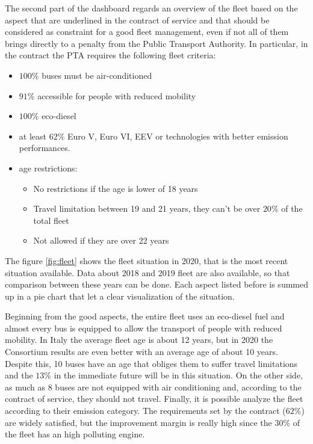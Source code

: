 The second part of the dashboard regards an overview of the fleet based on the aspect that are underlined in the contract of service and that should be considered as constraint for a good fleet management, even if not all of them brings directly to a penalty from the Public Transport Authority. 
In particular, in the contract the PTA requires the following fleet criteria:
\begin{itemize}
\item $100\%$ buses must be air-conditioned
\item $91\%$ accessible for people with reduced mobility
\item  $100\%$ eco-diesel
\item at least $62\%$ Euro V, Euro VI, EEV or technologies with better emission performances.
\item  age restrictions:
    \begin{itemize}
        \item No restrictions if the age is lower of 18 years
        \item Travel limitation between 19 and 21 years, they can't be over $20\%$ of the total fleet
        \item Not allowed if they are over 22 years
    \end{itemize}
\end{itemize}
The figure \ref{fig:fleet}
shows the fleet situation in 2020, that is the most recent situation available. Data about 2018 and 2019 fleet are also available, so that comparison between these years can be done. Each aspect listed before is summed up in a pie chart that let a clear visualization of the situation.

Beginning from the good aspects, the entire fleet uses an eco-diesel fuel and almost every bus is equipped to allow the transport of people with reduced mobility. 
In Italy the average fleet age is about 12 years\cite{rossiPTM}, but in 2020 the Consortium results are even better with an average age of about 10 years. Despite this, 10 buses have an age that obliges them to suffer travel limitations and the $13\%$ in the immediate future will be in this situation. 
On the other side, as much as 8 buses are not equipped with air conditioning and, according to the contract of service, they should not travel. Finally, it is possible analyze the fleet according to their emission category. The requirements set by the contract ($62\%$) are widely satisfied, but the improvement margin is really high since the $30\%$ of the fleet has an high polluting engine. 


